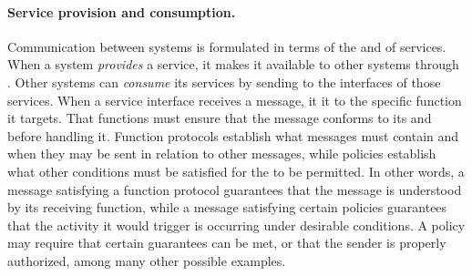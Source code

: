 \paragraph{Service provision and consumption.}
Communication between systems is formulated in terms of the  and  of services.
When a system \textit{provides} a service, it makes it available to other systems through .
Other systems can \textit{consume} its services by sending  to the interfaces of those services.
When a service interface receives a message, it  it to the specific function it targets.
That functions must ensure that the message conforms to its  and  before handling it.
Function protocols establish what messages must contain and when they may be sent in relation to other messages, while policies establish what other conditions must be satisfied for the  to be permitted.
In other words, a message satisfying a function protocol guarantees that the message is understood by its receiving function, while a message satisfying certain policies guarantees that the activity it would trigger is occurring under desirable conditions.
A policy may require that certain  guarantees can be met, or that the sender is properly authorized, among many other possible examples.

